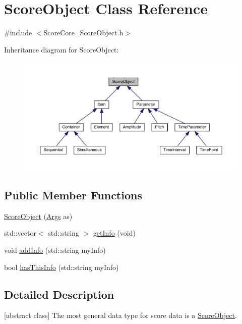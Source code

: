 \hypertarget{class_score_object}{\section{Score\-Object Class Reference}
\label{class_score_object}
}


{\ttfamily \#include $<$Score\-Core\-\_\-\-Score\-Object.\-h$>$}



Inheritance diagram for Score\-Object\-:\nopagebreak
\begin{figure}[H]
\begin{center}
\leavevmode
\includegraphics[width=350pt]{class_score_object__inherit__graph}
\end{center}
\end{figure}
\subsection*{Public Member Functions}
\begin{DoxyCompactItemize}
\item 
\hyperlink{class_score_object_a5d48b3ff7db868ad8d18716971d2e7c0}{Score\-Object} (\hyperlink{_score_core___score_object_8h_ab88aad89d974920ebfb0b0c9e46f61b4}{Args} as)
\item 
std\-::vector$<$ std\-::string $>$ \hyperlink{class_score_object_a10003206c88edf43e25180ddd06b8ad9}{get\-Info} (void)
\item 
void \hyperlink{class_score_object_a89b5be30134e8d77dbe1c253bc009b08}{add\-Info} (std\-::string my\-Info)
\item 
bool \hyperlink{class_score_object_a2625bd41018f22bcb9a64e2664cb9908}{has\-This\-Info} (std\-::string my\-Info)
\end{DoxyCompactItemize}


\subsection{Detailed Description}
\mbox{[}abstract class\mbox{]} The most general data type for score data is a \hyperlink{class_score_object}{Score\-Object}. 

